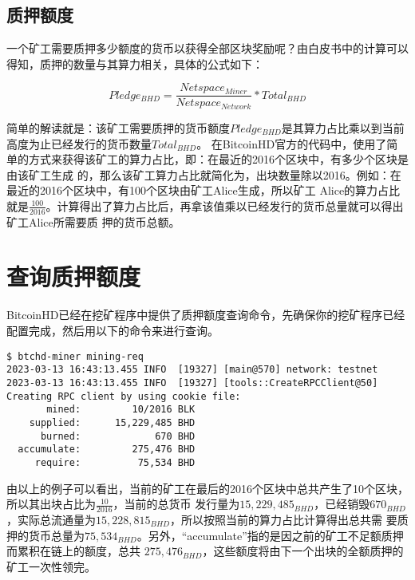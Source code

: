 \begin{flushleft}
\subsection{质押额度}
\begin{flushleft}
    一个矿工需要质押多少额度的货币以获得全部区块奖励呢？由白皮书中的计算可以得知，质押的数量与其算力相关，具体的公式如下：
\end{flushleft}
\begin{equation}
    Pledge_{BHD}=\frac{Netspace_{Miner}}{Netspace_{Network}}*Total_{BHD}
\end{equation}
\begin{flushleft}
    简单的解读就是：该矿工需要质押的货币额度$Pledge_{BHD}$是其算力占比乘以到当前高度为止已经发行的货币数量$Total_{BHD}$。
    在BitcoinHD官方的代码中，使用了简单的方式来获得该矿工的算力占比，即：在最近的2016个区块中，有多少个区块是由该矿工生成
    的，那么该矿工算力占比就简化为，出块数量除以2016。例如：在最近的2016个区块中，有100个区块由矿工Alice生成，所以矿工
    Alice的算力占比就是$\frac{100}{2016}$。计算得出了算力占比后，再拿该值乘以已经发行的货币总量就可以得出矿工Alice所需要质
    押的货币总额。
\end{flushleft}
\section{查询质押额度}
\begin{flushleft}
    BitcoinHD已经在挖矿程序中提供了质押额度查询命令，先确保你的挖矿程序已经配置完成，然后用以下的命令来进行查询。
\end{flushleft}
\scriptsize
\begin{verbatim}
$ btchd-miner mining-req
2023-03-13 16:43:13.455 INFO  [19327] [main@570] network: testnet
2023-03-13 16:43:13.455 INFO  [19327] [tools::CreateRPCClient@50] Creating RPC client by using cookie file:
       mined:         10/2016 BLK
    supplied:      15,229,485 BHD
      burned:             670 BHD
  accumulate:         275,476 BHD
     require:          75,534 BHD
\end{verbatim}
\normalsize
\begin{flushleft}
    由以上的例子可以看出，当前的矿工在最后的2016个区块中总共产生了10个区块，所以其出块占比为$\frac{10}{2016}$，当前的总货币
    发行量为$15,229,485_{BHD}$，已经销毁$670_{BHD}$，实际总流通量为$15,228,815_{BHD}$，所以按照当前的算力占比计算得出总共需
    要质押的货币总量为$75,534_{BHD}$。另外，``accumulate''指的是因之前的矿工不足额质押而累积在链上的额度，总共
    $275,476_{BHD}$，这些额度将由下一个出块的全额质押的矿工一次性领完。
\end{flushleft}

\end{flushleft}
